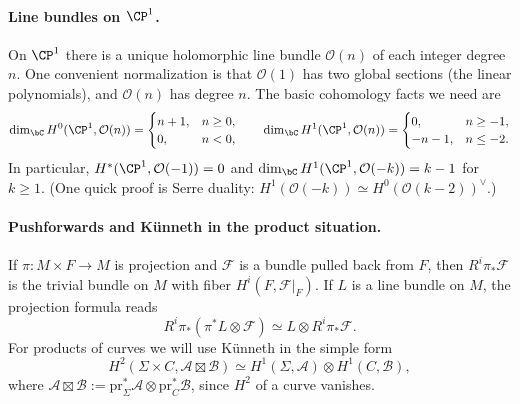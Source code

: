 \documentclass[12pt]{article}
\begin{document}
\paragraph{Line bundles on $\CP^1$.}
On $\CP^1$ there is a unique holomorphic line bundle $\mathcal{O}(n)$ of each
integer degree $n$. One convenient normalization is that $\mathcal{O}(1)$ has
two global sections (the linear polynomials), and $\mathcal{O}(n)$ has degree
$n$. The basic cohomology facts we need are
\begin{equation*}
  \dim_\bC H^0(\CP^1,\mathcal{O}(n))=
  \begin{cases}
    n+1, & n\ge 0,\\
    0, & n<0,
  \end{cases}
  \qquad
  \dim_\bC H^1(\CP^1,\mathcal{O}(n))=
  \begin{cases}
    0, & n\ge -1,\\
    -n-1, & n\le -2.
  \end{cases}
\end{equation*}
In particular, $H^*(\CP^1,\mathcal{O}(-1))=0$ and $\dim_\bC H^1(\CP^1,\mathcal{O}(-k))=k-1$
for $k\ge1$. (One quick proof is Serre duality:
$H^1(\mathcal{O}(-k))\simeq H^0(\mathcal{O}(k-2))^\vee$.)

\paragraph{Pushforwards and K\"unneth in the product situation.}
If $\pi:M\times F\to M$ is projection and $\mathcal{F}$ is a bundle pulled back
from $F$, then $R^i\pi_*\mathcal{F}$ is the trivial bundle on $M$ with fiber
$H^i(F,\mathcal{F}|_F)$. If $L$ is a line bundle on $M$, the projection formula
reads
\begin{equation*}
  R^i\pi_*(\pi^*L\otimes\mathcal{F})\simeq L\otimes R^i\pi_*\mathcal{F}.
\end{equation*}
For products of curves we will use K\"unneth in the simple form
\begin{equation*}
  H^2(\Sigma\times C,\mathcal{A}\boxtimes\mathcal{B})
  \simeq H^1(\Sigma,\mathcal{A})\otimes H^1(C,\mathcal{B}),
\end{equation*}
where $\mathcal{A}\boxtimes\mathcal{B}:=\mathrm{pr}_\Sigma^*\mathcal{A}\otimes \mathrm{pr}_C^*\mathcal{B}$,
since $H^2$ of a curve vanishes.
\end{document}
